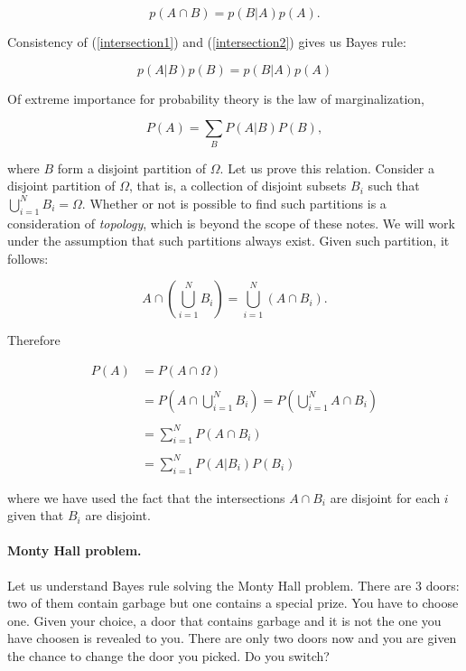 \documentclass[12pt]{article}
\begin{document}
\begin{equation} \label{intersection2}
p(A \cap B) = p( B | A ) p (A).
\end{equation}

\noindent
Consistency of (\ref{intersection1}) and (\ref{intersection2}) gives us 
Bayes rule:

\begin{equation}
p( A | B ) p (B) = 
p( B | A ) p (A)
\end{equation}

Of extreme importance for probability theory is the law of marginalization,

\begin{equation}
P(A) = \sum_{B} P(A | B) P(B),
\end{equation}

\noindent
where $B$ form a disjoint partition of $\Omega$.
Let us prove this relation.
Consider a disjoint partition of $\Omega$, that is, a collection of disjoint
subsets $B_{i}$ such that $ \bigcup_{i = 1}^{N} B_{i} = \Omega$.
Whether or not is possible to find such partitions is a consideration of 
\textit{topology}, which is beyond the scope of these notes.
We will work under the assumption that such partitions always exist. 
Given such partition, it follows:

\begin{equation}
A \cap \left( \bigcup_{i = 1}^{N} B_{i} \right) = \bigcup_{i = 1}^{N} \left( A \cap B_{i} \right).
\end{equation}

\noindent
Therefore

\begin{align}
P(A) &= P(A \cap \Omega)
\nonumber \\
\nonumber \\
&= P \left( A \cap \bigcup_{i = 1}^{N} B_{i} \right) 
= P \left( \bigcup_{i=1}^{N}  A \cap B_{i} \right) 
\nonumber \\
\nonumber \\
&= \sum_{i = 1}^{N} P \left( A \cap B_{i} \right) 
\nonumber \\
\nonumber \\
&= \sum_{i = 1}^{N} P \left( A | B_{i} \right) P(B_{i})
\end{align}

\noindent
where we have used the fact that the intersections $A \cap B_{i}$ are disjoint
for each $i$ given that $B_{i}$ are disjoint.
\paragraph{Monty Hall problem.}
Let us understand Bayes rule solving the Monty Hall problem.
There are $3$ doors: two of them contain garbage but one contains a special prize.
You have to choose one.
Given your choice, a door that contains garbage and it is not the one you have choosen is revealed to you.
There are only two doors now and you are given the chance to change the door you picked. Do you switch?
\end{document}
